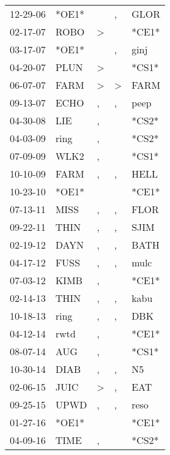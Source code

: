 \begin{supertabular}{lllll}
 12-29-06 &  *OE1* &               &             , &   GLOR \\
 02-17-07 &   ROBO &  \textgreater &               &  *CE1* \\
 03-17-07 &  *OE1* &               &             , &   ginj \\
 04-20-07 &   PLUN &  \textgreater &               &  *CS1* \\
 06-07-07 &   FARM &  \textgreater &  \textgreater &   FARM \\
 09-13-07 &   ECHO &             , &             , &   peep \\
 04-30-08 &    LIE &             , &               &  *CS2* \\
 04-03-09 &   ring &             , &               &  *CS2* \\
 07-09-09 &   WLK2 &             , &               &  *CS1* \\
 10-10-09 &   FARM &             , &             , &   HELL \\
 10-23-10 &  *OE1* &               &               &  *CE1* \\
 07-13-11 &   MISS &             , &             , &   FLOR \\
 09-22-11 &   THIN &             , &             , &   SJIM \\
 02-19-12 &   DAYN &             , &             , &   BATH \\
 04-17-12 &   FUSS &             , &             , &   mulc \\
 07-03-12 &   KIMB &             , &               &  *CE1* \\
 02-14-13 &   THIN &             , &             , &   kabu \\
 10-18-13 &   ring &             , &             , &    DBK \\
 04-12-14 &   rwtd &             , &               &  *CE1* \\
 08-07-14 &    AUG &             , &               &  *CS1* \\
 10-30-14 &   DIAB &             , &             , &     N5 \\
 02-06-15 &   JUIC &  \textgreater &             , &    EAT \\
 09-25-15 &   UPWD &             , &             , &   reso \\
 01-27-16 &  *OE1* &               &               &  *CE1* \\
 04-09-16 &   TIME &             , &               &  *CS2* \\

\end{supertabular}
